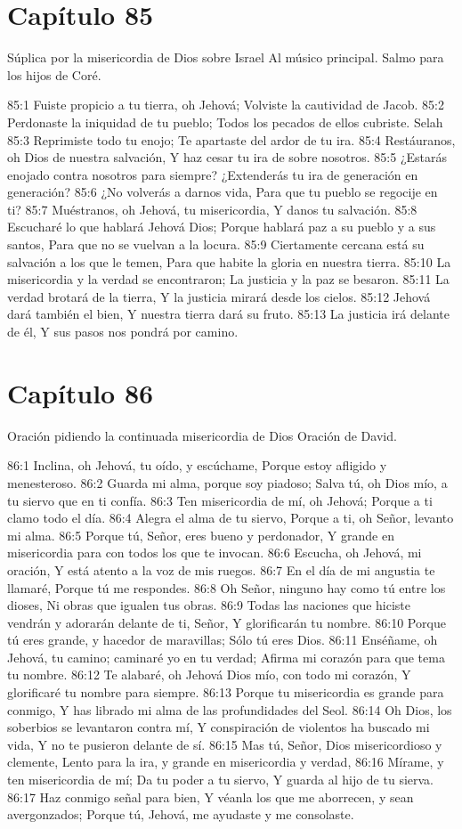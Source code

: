 \section*{Capítulo 85}
Súplica por la misericordia de Dios sobre Israel 
Al músico principal. Salmo para los hijos de Coré. 
 
85:1 Fuiste propicio a tu tierra, oh Jehová; 
Volviste la cautividad de Jacob. 
85:2 Perdonaste la iniquidad de tu pueblo; 
Todos los pecados de ellos cubriste. Selah 
85:3 Reprimiste todo tu enojo; 
Te apartaste del ardor de tu ira. 
85:4 Restáuranos, oh Dios de nuestra salvación, 
Y haz cesar tu ira de sobre nosotros. 
85:5 ¿Estarás enojado contra nosotros para siempre? 
¿Extenderás tu ira de generación en generación? 
85:6 ¿No volverás a darnos vida, 
Para que tu pueblo se regocije en ti? 
85:7 Muéstranos, oh Jehová, tu misericordia, 
Y danos tu salvación. 
85:8 Escucharé lo que hablará Jehová Dios; 
Porque hablará paz a su pueblo y a sus santos, 
Para que no se vuelvan a la locura. 
85:9 Ciertamente cercana está su salvación a los que le temen, 
Para que habite la gloria en nuestra tierra. 
85:10 La misericordia y la verdad se encontraron; 
La justicia y la paz se besaron. 
85:11 La verdad brotará de la tierra, 
Y la justicia mirará desde los cielos. 
85:12 Jehová dará también el bien, 
Y nuestra tierra dará su fruto. 
85:13 La justicia irá delante de él, 
Y sus pasos nos pondrá por camino. 
\section*{Capítulo 86}
Oración pidiendo la continuada misericordia de Dios 
Oración de David. 
 
86:1 Inclina, oh Jehová, tu oído, y escúchame, 
Porque estoy afligido y menesteroso. 
86:2 Guarda mi alma, porque soy piadoso; 
Salva tú, oh Dios mío, a tu siervo que en ti confía. 
86:3 Ten misericordia de mí, oh Jehová; 
Porque a ti clamo todo el día. 
86:4 Alegra el alma de tu siervo, 
Porque a ti, oh Señor, levanto mi alma. 
86:5 Porque tú, Señor, eres bueno y perdonador, 
Y grande en misericordia para con todos los que te invocan. 
86:6 Escucha, oh Jehová, mi oración, 
Y está atento a la voz de mis ruegos. 
86:7 En el día de mi angustia te llamaré, 
Porque tú me respondes. 
86:8 Oh Señor, ninguno hay como tú entre los dioses, 
Ni obras que igualen tus obras. 
86:9 Todas las naciones que hiciste vendrán y adorarán delante de ti, Señor, 
Y glorificarán tu nombre. 
86:10 Porque tú eres grande, y hacedor de maravillas; 
Sólo tú eres Dios. 
86:11 Enséñame, oh Jehová, tu camino; caminaré yo en tu verdad; 
Afirma mi corazón para que tema tu nombre. 
86:12 Te alabaré, oh Jehová Dios mío, con todo mi corazón, 
Y glorificaré tu nombre para siempre. 
86:13 Porque tu misericordia es grande para conmigo, 
Y has librado mi alma de las profundidades del Seol. 
86:14 Oh Dios, los soberbios se levantaron contra mí, 
Y conspiración de violentos ha buscado mi vida, 
Y no te pusieron delante de sí. 
86:15 Mas tú, Señor, Dios misericordioso y clemente, 
Lento para la ira, y grande en misericordia y verdad, 
86:16 Mírame, y ten misericordia de mí; 
Da tu poder a tu siervo, 
Y guarda al hijo de tu sierva. 
86:17 Haz conmigo señal para bien, 
Y véanla los que me aborrecen, y sean avergonzados; 
Porque tú, Jehová, me ayudaste y me consolaste. 

